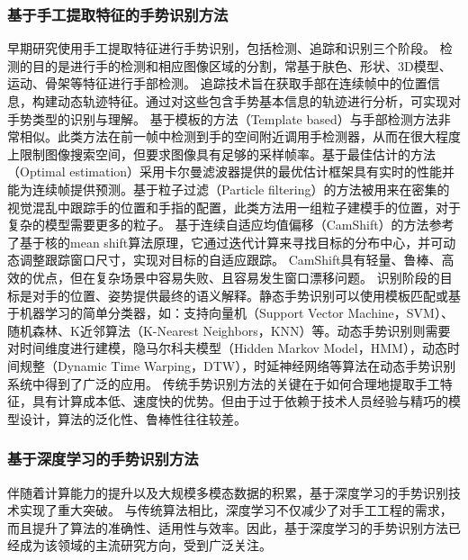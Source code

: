 \subsubsection{基于手工提取特征的手势识别方法}
早期研究使用手工提取特征进行手势识别，包括检测、追踪和识别三个阶段\cite{rautaray2015vision}。
检测的目的是进行手的检测和相应图像区域的分割，常基于肤色\cite{sigal2004skin}、形状\cite{chen2007real}、3D模型\cite{tekin2019h+}、运动\cite{pun2011real}、骨架\cite{jiang2021chal21}等特征进行手部检测。
追踪技术旨在获取手部在连续帧中的位置信息，构建动态轨迹特征。通过对这些包含手势基本信息的轨迹进行分析，可实现对手势类型的识别与理解。
基于模板的方法（Template based）\cite{crowley1995finger}与手部检测方法非常相似。此类方法在前一帧中检测到手的空间附近调用手检测器，从而在很大程度上限制图像搜索空间，但要求图像具有足够的采样帧率。基于最佳估计的方法（Optimal estimation）\cite{argyros2004real}采用卡尔曼滤波器\cite{kalman1960new}提供的最优估计框架具有实时的性能并能为连续帧提供预测。基于粒子过滤（Particle filtering）的方法\cite{perez2002color}被用来在密集的视觉混乱中跟踪手的位置和手指的配置，此类方法用一组粒子建模手的位置，对于复杂的模型需要更多的粒子。
基于连续自适应均值偏移（CamShift）的方法\cite{wang2010study}参考了基于核的mean shift算法原理，它通过迭代计算来寻找目标的分布中心，并可动态调整跟踪窗口尺寸，实现对目标的自适应跟踪。
CamShift具有轻量、鲁棒、高效的优点，但在复杂场景中容易失败、且容易发生窗口漂移问题。
识别阶段的目标是对手的位置、姿势提供最终的语义解释。静态手势识别可以使用模板匹配或基于机器学习的简单分类器\cite{基于视觉的动态手势识别研究综述}，如：支持向量机（Support Vector Machine，SVM）\cite{burges1998tutorial}、随机森林\cite{基于视觉的动态手势识别研究综述}、K近邻算法（K-Nearest Neighbors，KNN）\cite{thirumuruganathan2010knn}等。动态手势识别则需要对时间维度进行建模，隐马尔科夫模型（Hidden Markov Model，HMM）\cite{liang1996sign}，动态时间规整（Dynamic Time Warping，DTW）\cite{corradini2001dynamic}，时延神经网络\cite{sigal2004skin}等算法在动态手势识别系统中得到了广泛的应用。
传统手势识别方法的关键在于如何合理地提取手工特征，具有计算成本低、速度快的优势。但由于过于依赖于技术人员经验与精巧的模型设计，算法的泛化性、鲁棒性往往较差。

\subsubsection{基于深度学习的手势识别方法} %
伴随着计算能力的提升以及大规模多模态数据的积累，基于深度学习的手势识别技术实现了重大突破。
与传统算法相比，深度学习不仅减少了对手工工程的需求，而且提升了算法的准确性、适用性与效率。因此，基于深度学习的手势识别方法已经成为该领域的主流研究方向，受到广泛关注。

